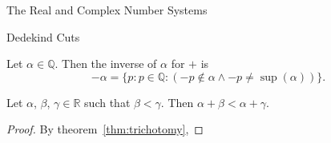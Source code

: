 \begin{chapter}{The Real and Complex Number Systems}
\begin{section}{Dedekind Cuts}
	\begin{definition}
		\label{def:cut-additive-inverse}
		Let $\alpha \in \mathbb{Q}$. Then the inverse of $\alpha$ for $+$ is
		\[ -\alpha = \{p : p \in \mathbb{Q} : (-p \nin \alpha \land -p \neq 
		\sup(\alpha))\}. \] 
	\end{definition}

	\begin{theorem}
		\label{thm:}
		Let $\alpha$, $\beta$, $\gamma \in \mathbb{R}$ such that $\beta < \gamma$. 
		Then $\alpha + \beta < \alpha + \gamma$.
	\end{theorem}

	\begin{proof}
		By theorem~\ref{thm:trichotomy}, 
	\end{proof}

\end{section}
	
\end{chapter}
